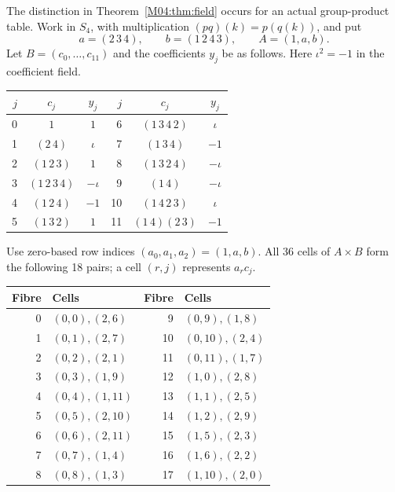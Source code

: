 \documentclass[11pt,a4paper,oneside]{report}
\theoremstyle{definition}
\theoremstyle{remark}
\begin{document}
The distinction in Theorem~\ref{M04:thm:field} occurs for an actual
group-product table. Work in $S_4$, with multiplication
$(pq)(k)=p(q(k))$, and put
\[
a=(2\,3\,4),\qquad b=(1\,2\,4\,3),\qquad A=(1,a,b).
\]
Let $B=(c_0,\ldots,c_{11})$ and the coefficients $y_j$ be as follows.
Here $\iota^2=-1$ in the coefficient field.

\begin{center}
\begin{tabular}{@{}rcc@{\qquad}rcc@{}}
\toprule
$j$&$c_j$&$y_j$&$j$&$c_j$&$y_j$\\
\midrule
0&$1$&$1$&6&$(1\,3\,4\,2)$&$\iota$\\
1&$(2\,4)$&$\iota$&7&$(1\,3\,4)$&$-1$\\
2&$(1\,2\,3)$&$1$&8&$(1\,3\,2\,4)$&$-\iota$\\
3&$(1\,2\,3\,4)$&$-\iota$&9&$(1\,4)$&$-\iota$\\
4&$(1\,2\,4)$&$-1$&10&$(1\,4\,2\,3)$&$\iota$\\
5&$(1\,3\,2)$&$1$&11&$(1\,4)(2\,3)$&$-1$\\
\bottomrule
\end{tabular}
\end{center}

Use zero-based row indices $(a_0,a_1,a_2)=(1,a,b)$. All 36 cells of
$A\times B$ form the following 18 pairs; a cell $(r,j)$ represents
$a_r c_j$.

\begin{center}
\begin{tabular}{@{}rl@{\qquad}rl@{}}
\toprule
Fibre&Cells&Fibre&Cells\\
\midrule
0&$(0,0),(2,6)$&9&$(0,9),(1,8)$\\
1&$(0,1),(2,7)$&10&$(0,10),(2,4)$\\
2&$(0,2),(2,1)$&11&$(0,11),(1,7)$\\
3&$(0,3),(1,9)$&12&$(1,0),(2,8)$\\
4&$(0,4),(1,11)$&13&$(1,1),(2,5)$\\
5&$(0,5),(2,10)$&14&$(1,2),(2,9)$\\
6&$(0,6),(2,11)$&15&$(1,5),(2,3)$\\
7&$(0,7),(1,4)$&16&$(1,6),(2,2)$\\
8&$(0,8),(1,3)$&17&$(1,10),(2,0)$\\
\bottomrule
\end{tabular}
\end{center}
\end{document}
